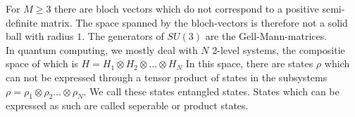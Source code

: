 For $M\ge3$ there are bloch vectors which do not correspond to a positive semi-definite matrix.
The space spanned by the bloch-vectors is therefore not a solid ball with radius $1$.
The generators of  $SU(3)$ are the Gell-Mann-matrices.  \\
In quantum computing, we mostly deal with $N$ 2-level systems, the compositie space of which is $H = H_1 \otimes H_2 \otimes \ldots \otimes H_N$
In this space, there are states $\rho$ which can not be expressed through a tensor product of states in the subsystems $\rho = \rho_1\otimes\rho_2\ldots\otimes\rho_N$.
We call these states entangled states.
States which can be expressed as such are called seperable or product states.
